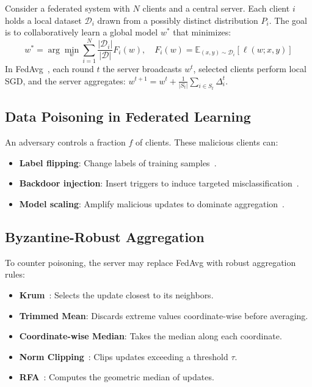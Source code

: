 \documentclass{article}
\begin{document}
Consider a federated system with $N$ clients and a central server. Each client $i$ holds a local dataset $\mathcal{D}_i$ drawn from a possibly distinct distribution $P_i$. The goal is to collaboratively learn a global model $w^*$ that minimizes:
\begin{equation}
    w^* = \arg\min_w \sum_{i=1}^{N} \frac{|\mathcal{D}_i|}{|\mathcal{D}|} F_i(w), \quad F_i(w) = \mathbb{E}_{(x,y)\sim \mathcal{D}_i}[\ell(w; x, y)]
\end{equation}
In FedAvg~\citep{mcmahan2017communication}, each round $t$ the server broadcasts $w^t$, selected clients perform local SGD, and the server aggregates: $w^{t+1} = w^t + \frac{1}{|S_t|}\sum_{i \in S_t} \Delta_i^t$.

\subsection{Data Poisoning in Federated Learning}

An adversary controls a fraction $f$ of clients. These malicious clients can:
\begin{itemize}
    \item \textbf{Label flipping}: Change labels of training samples~\citep{chen2017targeted}.
    \item \textbf{Backdoor injection}: Insert triggers to induce targeted misclassification~\citep{bagdasaryan2020backdoor,xie2019dba}.
    \item \textbf{Model scaling}: Amplify malicious updates to dominate aggregation~\citep{bagdasaryan2020backdoor}.
\end{itemize}

\subsection{Byzantine-Robust Aggregation}

To counter poisoning, the server may replace FedAvg with robust aggregation rules:
\begin{itemize}
    \item \textbf{Krum}~\citep{blanchard2017machine}: Selects the update closest to its neighbors.
    \item \textbf{Trimmed Mean}: Discards extreme values coordinate-wise before averaging.
    \item \textbf{Coordinate-wise Median}: Takes the median along each coordinate.
    \item \textbf{Norm Clipping}~\citep{sun2019can}: Clips updates exceeding a threshold $\tau$.
    \item \textbf{RFA}~\citep{pillutla2019robust}: Computes the geometric median of updates.
\end{itemize}
\end{document}
